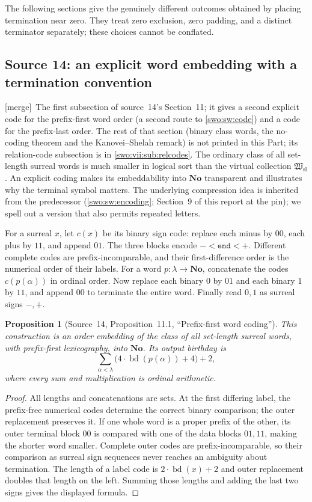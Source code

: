\documentclass[11pt]{article}
\newtheorem{proposition}[proposition]{Proposition}
\theoremstyle{definition}
\theoremstyle{remark}
\newcommand{\No}{\mathbf{No}}
\newcommand{\Hsl}{\mathfrak W_{\mathrm{sl}}}
\newcommand{\bd}{\operatorname{bd}}
\newcommand{\End}{\mathtt{end}}
\newcommand{\merge}{\textsf{[merge]}}
\begin{document}
The following sections give the genuinely different outcomes obtained
by placing termination near zero. They treat zero exclusion, zero
padding, and a distinct terminator separately; these choices cannot
be conflated.

\subsection{Source 14: an explicit word embedding with a termination convention}
\label{swo:tc:sec:embeddings}
\merge\ The first subsection of source~14's Section~11; it gives a second
explicit code for the prefix-first word order (a second route to
\cref{swo:sw:code}) and a code for the prefix-last order. The rest of that
section (binary class words, the no-coding theorem and the Kanovei--Shelah
remark) is not printed in this Part; its relation-code subsection is in
\cref{swo:vii:sub:relcodes}.
The ordinary class of all set-length surreal words is much smaller in
logical sort than the virtual collection $\Hsl$. An explicit coding makes
its embeddability into $\No$ transparent and illustrates why the terminal
symbol matters. The underlying compression idea is inherited from the
predecessor (\cref{swo:sw:encoding}; Section~9 of this report at the pin); we spell out a version that
also permits repeated letters.

For a surreal $x$, let $c(x)$ be its binary sign code: replace each
minus by $00$, each plus by $11$, and append $01$. The three blocks
encode $-<\End<+$. Different complete codes are prefix-incomparable,
and their first-difference order is the numerical order of their labels.
For a word $p:\lambda\to\No$, concatenate the codes $c(p(\alpha))$
in ordinal order. Now replace each binary $0$ by $01$ and each binary
$1$ by $11$, and append $00$ to terminate the entire word. Finally read
$0,1$ as surreal signs $-,+$.

\begin{proposition}[Source~14, Proposition~11.1, ``Prefix-first word coding'']\label{swo:tc:n11.1}
This construction is an order embedding of the class of all set-length
surreal words, with prefix-first lexicography, into $\No$. Its output
birthday is
\[
 \sum_{\alpha<\lambda}\bigl(4\cdot\bd(p(\alpha))+4\bigr)+2,
\]
where every sum and multiplication is ordinal arithmetic.
\end{proposition}
\begin{proof}
All lengths and concatenations are sets. At the first differing label,
the prefix-free numerical codes determine the correct binary comparison;
the outer replacement preserves it. If one whole word is a proper
prefix of the other, its outer terminal block $00$ is compared with
one of the data blocks $01,11$, making the shorter word smaller.
Complete outer codes are prefix-incomparable, so their comparison as
surreal sign sequences never reaches an ambiguity about termination.
The length of a label code is $2\cdot\bd(x)+2$ and outer replacement
doubles that length on the left. Summing those lengths and adding the
last two signs gives the displayed formula.
\end{proof}
\end{document}
